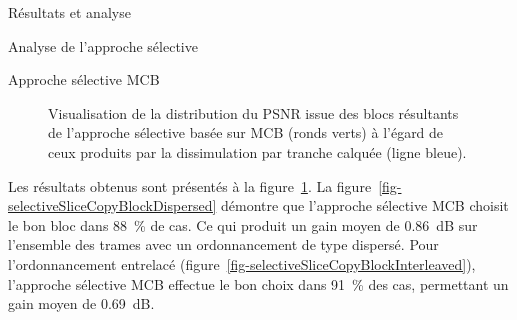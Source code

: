 \documentclass[letterpaper, twoside, 12pt,memoire]{thETS}
\newcommand{\fig}[1]{figure~\ref{#1}}
\begin{document}
\begin{chapter}{Résultats et analyse}
\begin{section}{Analyse de l'approche sélective}
\begin{subsection}{Approche sélective MCB}
\begin{figure}[htb]
\caption{Visualisation de la distribution du PSNR issue des blocs résultants de
l'approche sélective basée sur MCB (ronds verts) à l'égard de ceux produits par
la dissimulation par tranche calquée (ligne bleue).}
\label{fig-SelectiveSliceCopyBlocks}
\end{figure}

Les résultats obtenus sont présentés à la \fig{fig-SelectiveSliceCopyBlocks}. La
\fig{fig-selectiveSliceCopyBlockDispersed} démontre que l'approche sélective MCB
choisit le bon bloc dans 88~\% de cas. Ce qui produit un gain moyen de 0.86~dB
sur l'ensemble des trames avec un ordonnancement de type dispersé. Pour
l'ordonnancement entrelacé (\fig{fig-selectiveSliceCopyBlockInterleaved}),
l'approche sélective MCB effectue le bon choix dans 91~\% des cas, permettant un
gain moyen de 0.69~dB.


\end{subsection}
\end{section}
\end{chapter}
\end{document}
